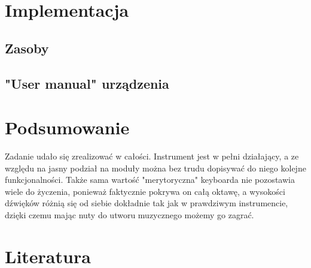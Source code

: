 \documentclass[a4paper,11pt]{article}
\begin{document}
\section{Implementacja}
\subsection{Zasoby}
\subsection{"User manual" urządzenia}

\section{Podsumowanie}
Zadanie udało się zrealizować w całości. Instrument jest w pełni działający, a ze względu na jasny podział na moduły można bez trudu dopisywać do niego kolejne funkcjonalności. Także sama wartość "merytoryczna" keyboarda nie pozostawia wiele do życzenia, ponieważ faktycznie pokrywa on całą oktawę, a wysokości dźwięków różnią się od siebie dokładnie tak jak w prawdziwym instrumencie, dzięki czemu mając nuty do utworu muzycznego możemy go zagrać.

\section{Literatura}
\end{document}

